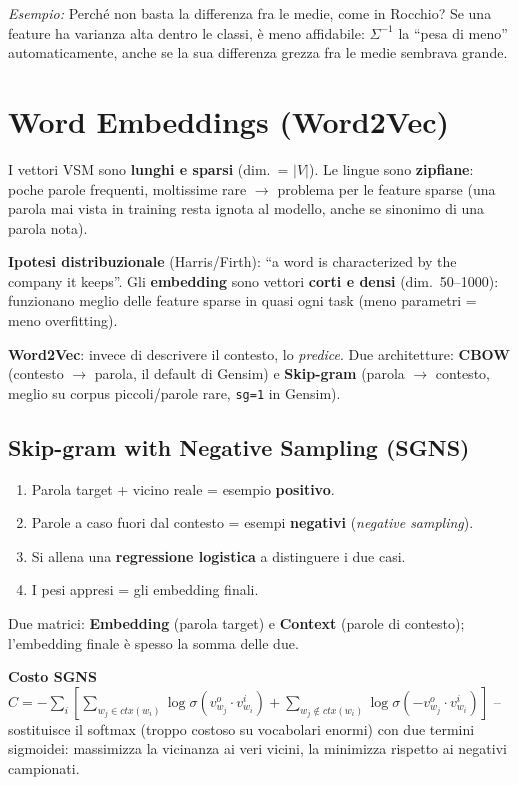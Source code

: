 \documentclass[11pt,a4paper]{article}
\newcommand{\formula}[2]{\begin{formulabox}\textbf{#1}\\[3pt]#2\end{formulabox}}
\newcommand{\es}[1]{\begin{esbox}\textit{Esempio:} #1\end{esbox}}
\begin{document}
\es{Perch\'e non basta la differenza fra le medie, come in Rocchio? Se una feature ha varianza alta dentro le classi, \`e meno affidabile: $\Sigma^{-1}$ la ``pesa di meno'' automaticamente, anche se la sua differenza grezza fra le medie sembrava grande.}

\section{Word Embeddings (Word2Vec)}

I vettori VSM sono \textbf{lunghi e sparsi} (dim.\ = $|V|$). Le lingue sono \textbf{zipfiane}: poche parole frequenti, moltissime rare $\to$ problema per le feature sparse (una parola mai vista in training resta ignota al modello, anche se sinonimo di una parola nota).

\textbf{Ipotesi distribuzionale} (Harris/Firth): ``a word is characterized by the company it keeps''. Gli \textbf{embedding} sono vettori \textbf{corti e densi} (dim.\ 50--1000): funzionano meglio delle feature sparse in quasi ogni task (meno parametri = meno overfitting).

\textbf{Word2Vec}: invece di descrivere il contesto, lo \emph{predice}. Due architetture: \textbf{CBOW} (contesto $\to$ parola, il default di Gensim) e \textbf{Skip-gram} (parola $\to$ contesto, meglio su corpus piccoli/parole rare, \texttt{sg=1} in Gensim).

\subsection*{Skip-gram with Negative Sampling (SGNS)}
\begin{enumerate}
  \item Parola target + vicino reale = esempio \textbf{positivo}.
  \item Parole a caso fuori dal contesto = esempi \textbf{negativi} (\emph{negative sampling}).
  \item Si allena una \textbf{regressione logistica} a distinguere i due casi.
  \item I pesi appresi = gli embedding finali.
\end{enumerate}
Due matrici: \textbf{Embedding} (parola target) e \textbf{Context} (parole di contesto); l'embedding finale \`e spesso la somma delle due.

\formula{Costo SGNS}{$C = -\sum_i\left[\sum_{w_j\in ctx(w_i)}\log\sigma(v^o_{w_j}\cdot v^i_{w_i}) + \sum_{w_j\notin ctx(w_i)}\log\sigma(-v^o_{w_j}\cdot v^i_{w_i})\right]$ -- sostituisce il softmax (troppo costoso su vocabolari enormi) con due termini sigmoidei: massimizza la vicinanza ai veri vicini, la minimizza rispetto ai negativi campionati.}
\end{document}
